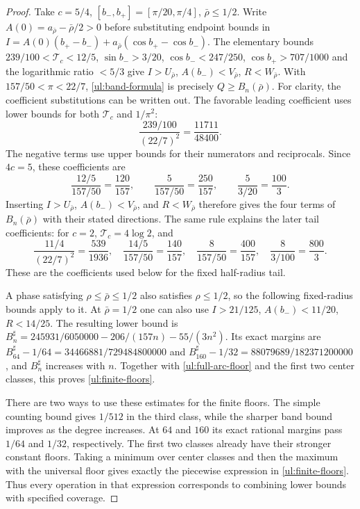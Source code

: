 \begin{proof}
Take $c=5/4$, $[b_-,b_+]=[\pi/20,\pi/4]$, $\bar{\rho}\leq1/2$.
Write $A(0)=a_{\bar\rho}-\bar\rho/2>0$ before substituting
endpoint bounds in $I=A(0)(b_+-b_-)+a_{\bar\rho}(\cos b_+-\cos b_-)$.
The elementary bounds
$239/100<\mathcal T_c<12/5$, $\sin b_->3/20$,
$\cos b_-<247/250$, $\cos b_+>707/1000$ and the logarithmic ratio
$<5/3$ give $I>U_{\bar{\rho}}$, $A(b_-)<V_{\bar{\rho}}$, $R<W_{\bar{\rho}}$.  With
$157/50<\pi<22/7$, \eqref{ul:band-formula} is precisely $Q\geq B_n(\bar{\rho})$.
For clarity, the coefficient substitutions can be written out.
The favorable leading coefficient uses lower bounds for both
$\mathcal T_c$ and $1/\pi^2$:
\[
 \frac{239/100}{(22/7)^2}=\frac{11711}{48400}.
\]
The negative terms use upper bounds for their numerators and
reciprocals.  Since $4c=5$, these coefficients are
\[
 \frac{12/5}{157/50}=\frac{120}{157},\qquad
 \frac5{157/50}=\frac{250}{157},\qquad
 \frac5{3/20}=\frac{100}{3}.
\]
Inserting $I>U_{\bar{\rho}}$, $A(b_-)<V_{\bar{\rho}}$, and $R<W_{\bar{\rho}}$ therefore gives the
four terms of $B_n(\bar{\rho})$ with their stated directions.  The same
rule explains the later tail coefficients: for $c=2$,
$\mathcal T_c=4\log2$, and
\[
 \frac{11/4}{(22/7)^2}=\frac{539}{1936},\quad
 \frac{14/5}{157/50}=\frac{140}{157},\quad
 \frac8{157/50}=\frac{400}{157},\quad
 \frac8{3/100}=\frac{800}{3}.
\]
These are the coefficients used below for the fixed half-radius tail.

A phase satisfying $\rho\leq\bar\rho\leq1/2$ also satisfies
$\rho\leq1/2$, so the following fixed-radius bounds apply to it.
At $\bar{\rho}=1/2$ one can also use $I>21/125$, $A(b_-)<11/20$, $R<14/25$.
The resulting lower bound is
$B_n^\sharp=245931/6050000-206/(157n)-55/(3n^2)$.  Its exact margins are
$B_{64}^\sharp-1/64=34466881/729484800000$ and
$B_{160}^\sharp-1/32=88079689/182371200000$, and $B_n^\sharp$ increases with $n$.
Together with \eqref{ul:full-arc-floor} and the first two center
classes, this proves \eqref{ul:finite-floors}.

There are two ways to use these estimates for the finite floors.
The simple counting bound gives $1/512$ in the third class, while
the sharper band bound improves as the degree increases.  At $64$
and $160$ its exact rational margins pass $1/64$ and $1/32$,
respectively.  The first two classes already have their stronger
constant floors.  Taking a minimum over center classes and then
the maximum with the universal floor gives exactly the piecewise
expression in \eqref{ul:finite-floors}.  Thus every operation in that
expression corresponds to combining lower bounds with specified
coverage.


\end{proof}
